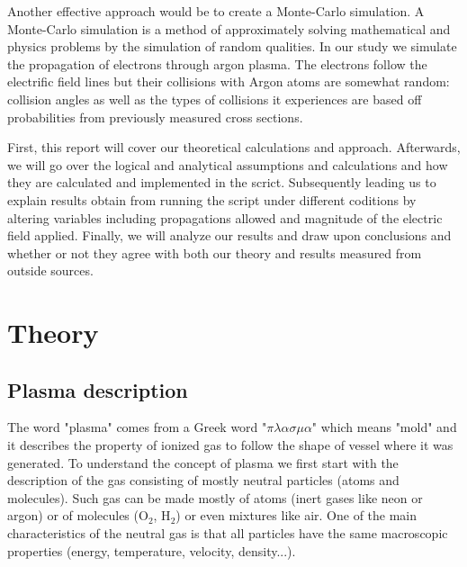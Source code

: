 \documentclass[12pt]{article}
\begin{document}
Another effective approach would be to create a Monte-Carlo simulation. A Monte-Carlo simulation is a method of approximately solving mathematical and physics problems by the simulation of random qualities. In our study we simulate the propagation of electrons through argon plasma. The electrons follow the electrific field lines but their collisions with Argon atoms are somewhat random: collision angles as well as the types of collisions it 
experiences are based off probabilities from previously measured cross sections.

First, this report will cover our theoretical calculations and approach. Afterwards, we will go over the logical and analytical assumptions 
and calculations and how they are calculated and implemented in the scrict. Subsequently leading us to explain results obtain from 
running the script under different coditions by altering variables including propagations allowed and magnitude of the electric field 
applied. Finally, we will analyze our results and draw upon conclusions and whether or not they agree with both our theory and results 
measured from outside sources.


\section{Theory}

\subsection{Plasma description}
The word "plasma" comes from a Greek word "$\pi\lambda\alpha\sigma\mu\alpha$" which means "mold" and it describes the property of ionized gas to follow the shape of vessel where it was generated. To understand the concept of plasma we first start with the description of the gas consisting of mostly neutral particles (atoms and molecules). Such gas can be made mostly of atoms (inert gases like neon or argon) or of molecules (O$_2$, H$_2$) or even mixtures like air. One of the main characteristics of the neutral gas is that all particles have the same macroscopic properties (energy, temperature, velocity, density...).
\end{document}

